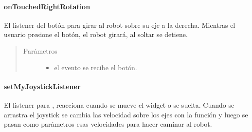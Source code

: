 \paragraph{onTouchedRightRotation}
\label{\detokenize{dev_docs:ontouchedrightrotation}}

\begin{fulllineitems}
\label{\detokenize{dev_docs:com.lar.cloudnao.RemoteControllerActivity.onTouchedRightRotation(MotionEvent)}}
El listener del botón para girar al robot sobre su eje  a la derecha. Mientras el usuario presione el botón, el robot girará, al soltar se detiene.
\begin{quote}\begin{description}
\item[{Parámetros}] \leavevmode\begin{itemize}
\item {} 
 \textendash{} el evento se recibe el botón.

\end{itemize}

\end{description}\end{quote}

\end{fulllineitems}



\paragraph{setMyJoystickListener}
\label{\detokenize{dev_docs:setmyjoysticklistener}}

\begin{fulllineitems}
\label{\detokenize{dev_docs:com.lar.cloudnao.RemoteControllerActivity.setMyJoystickListener()}}
El listener para {\hyperref[\detokenize{dev_docs:com.lar.cloudnao.RemoteControllerActivity.mJoystick}]{}}, reacciona cuando se mueve el widget o se suelta. Cuando se arrastra el joystick se cambia las velocidad sobre los ejes con la función {\hyperref[\detokenize{dev_docs:com.lar.cloudnao.RemoteControllerActivity.setMyJoystickListener()}]{}} y luego se pasan como parámetros esas velocidades para hacer caminar al robot.

\end{fulllineitems}




